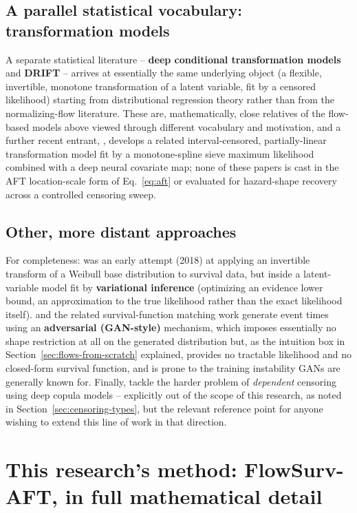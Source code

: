 \documentclass[11pt]{article}
\begin{document}
\subsection{A parallel statistical vocabulary: transformation models}
A separate statistical literature -- \textbf{deep conditional
transformation models} \citep{baumann2021transformation} and
\textbf{DRIFT} \citep{kolb2024drift} -- arrives at essentially the same
underlying object (a flexible, invertible, monotone transformation of a
latent variable, fit by a censored likelihood) starting from
distributional regression theory rather than from the normalizing-flow
literature. These are, mathematically, close relatives of the flow-based
models above viewed through different vocabulary and motivation, and a
further recent entrant, \citet{yuan2025transformation}, develops a
related interval-censored, partially-linear transformation model fit by
a monotone-spline sieve maximum likelihood combined with a deep neural
covariate map; none of these papers is cast in the AFT location-scale
form of Eq.~\eqref{eq:aft} or evaluated for hazard-shape recovery across
a controlled censoring sweep.

\subsection{Other, more distant approaches}
For completeness: \citet{miscouridou2018} was an early attempt (2018) at
applying an invertible transform of a Weibull base distribution to
survival data, but inside a latent-variable model fit by
\textbf{variational inference} (optimizing an evidence lower bound, an
approximation to the true likelihood rather than the exact likelihood
itself). \citet{chapfuwa2018adversarial} and the related survival-function
matching work \citep{chapfuwa2021sfm} generate event times using an
\textbf{adversarial (GAN-style)} mechanism, which imposes essentially no
shape restriction at all on the generated distribution but, as the
intuition box in Section~\ref{sec:flows-from-scratch} explained, provides
no tractable likelihood and no closed-form survival function, and is
prone to the training instability GANs are generally known for. Finally,
\citet{gharari2023copula} tackle the harder problem of
\emph{dependent} censoring using deep copula models -- explicitly out of
the scope of this research, as noted in Section~\ref{sec:censoring-types},
but the relevant reference point for anyone wishing to extend this line
of work in that direction.

\section{This research's method: FlowSurv-AFT, in full mathematical detail}
\label{sec:model}
\end{document}
